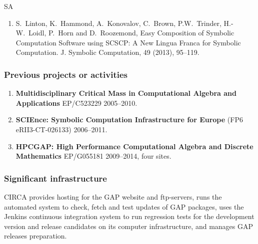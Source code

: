 \begin{sitedescription}{SA}
\begin{enumerate}
\item S.~Linton, K.~Hammond, A.~Konovalov, C.~Brown, P.W.~Trinder, H.-W.~Loidl, 
P.~Horn and D.~Roozemond, Easy Composition of Symbolic Computation Software using 
SCSCP: A New Lingua Franca for Symbolic Computation.
J. Symbolic Computation, 49 (2013), 95--119.
\end{enumerate}

\subsubsection*{Previous projects or activities}

\begin{enumerate}
\item
\textbf{Multidisciplinary Critical Mass in Computational
Algebra and Applications} EP/C523229 2005--2010.
\item 
\textbf{SCIEnce: Symbolic Computation Infrastructure for Europe}
(FP6 eRII3-CT-026133) 2006--2011.
\item
\textbf{HPCGAP: High Performance Computational Algebra and Discrete Mathematics} 
EP/G055181 2009--2014, four sites.
\end{enumerate}

\subsubsection*{Significant infrastructure}

CIRCA provides hosting for the GAP website and ftp-servers, runs the 
automated system to check, fetch and test updates of GAP packages, uses 
the Jenkins continuous integration system to run regression tests for the 
development version and release candidates on its computer infrastructure, 
and manages GAP releases preparation.
\end{sitedescription}
